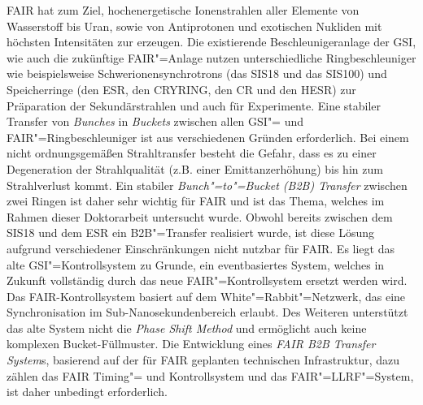FAIR hat zum Ziel, hochenergetische Ionenstrahlen aller Elemente von Wasserstoff bis Uran, sowie von Antiprotonen und exotischen Nukliden mit h\"ochsten  Intensit\"aten zur erzeugen. Die existierende Beschleunigeranlage der GSI, wie auch die zukünftige FAIR"=Anlage nutzen unterschiedliche Ringbeschleuniger wie beispielsweise Schwerionensynchrotrons (das SIS18 und das SIS100) und Speicherringe (den ESR, den CRYRING, den CR und den HESR) zur Pr\"aparation der Sekund\"arstrahlen und auch f\"ur Experimente.  Eine stabiler Transfer von \textit{Bunches} in \textit{Buckets} zwischen allen GSI"= und FAIR"=Ringbeschleuniger ist aus verschiedenen Gr\"unden erforderlich. Bei einem nicht ordnungsgem\"a\ss{}en Strahltransfer besteht die Gefahr, dass es zu einer Degeneration der Strahlqualit\"at (z.B.  einer Emittanzerh\"ohung) bis hin zum Strahlverlust kommt. Ein stabiler \textit{Bunch"=to"=Bucket (B2B) Transfer} zwischen zwei Ringen ist daher sehr wichtig f\"ur FAIR und ist das Thema, welches im Rahmen dieser Doktorarbeit untersucht wurde. Obwohl bereits zwischen dem SIS18 und dem ESR ein B2B"=Transfer realisiert wurde, ist diese L\"osung aufgrund verschiedener Einschr\"ankungen nicht nutzbar f\"ur FAIR. Es liegt das alte GSI"=Kontrollsystem  zu Grunde, ein eventbasiertes System, welches in Zukunft vollst\"andig durch das neue FAIR"=Kontrollsystem ersetzt werden wird. Das FAIR-Kontrollsystem basiert auf dem White"=Rabbit"=Netzwerk, das eine Synchronisation im Sub-Nanosekundenbereich erlaubt. Des Weiteren unterst\"utzt das alte System nicht die \textit{Phase Shift Method} und erm\"oglicht auch keine komplexen Bucket-F\"ullmuster. Die Entwicklung eines \textit{FAIR B2B Transfer System}s, basierend auf der f\"ur FAIR geplanten technischen Infrastruktur, dazu z\"ahlen das FAIR Timing"= und Kontrollsystem und das FAIR"=LLRF"=System, ist daher unbedingt erforderlich.

